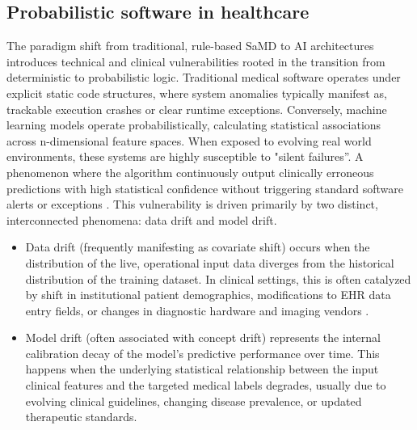 \documentclass[11pt,a4paper]{article}
\begin{document}
\subsection{Probabilistic software in healthcare}
\label{sec:Probabilistic software in healthcare}

The paradigm shift from traditional, rule-based SaMD to AI architectures introduces technical and clinical vulnerabilities rooted in the transition from deterministic to probabilistic logic. Traditional medical software operates under explicit static code structures, where system anomalies typically manifest as, trackable execution crashes or clear runtime exceptions. Conversely, machine learning models operate probabilistically, calculating statistical associations across n-dimensional feature spaces. When exposed to evolving real world environments, these systems are highly susceptible to "silent failures”. A phenomenon where the algorithm continuously output clinically erroneous predictions with high statistical confidence without triggering standard software alerts or exceptions \cite{finlayson2019adversarial} .
This vulnerability is driven primarily by two distinct, interconnected phenomena: data drift and model drift.

\begin{itemize}
  
 \item Data drift (frequently manifesting as covariate shift) occurs when the distribution of the live, operational input data diverges from the historical  distribution of the training dataset. In clinical settings, this is often catalyzed by shift in  institutional patient demographics, modifications to EHR data entry fields, or changes in diagnostic hardware and imaging vendors \cite{atomicspin2026} \cite{evidentlyai2024} .

\item Model drift (often associated with concept drift) represents the internal calibration decay of the model's predictive performance over time. This happens when the underlying statistical relationship between the input clinical features and the targeted medical labels degrades, usually due to evolving clinical guidelines, changing disease prevalence, or updated therapeutic standards. 

\end{itemize}
\end{document}
